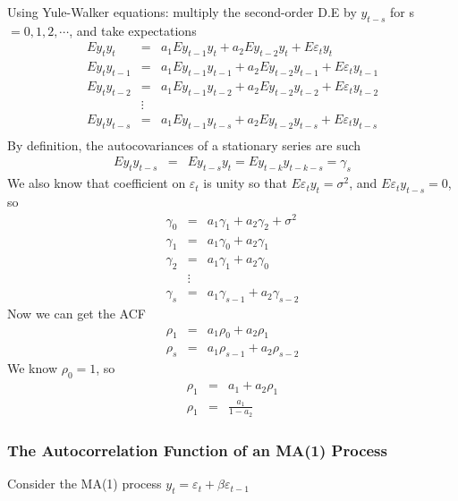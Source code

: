 Using Yule-Walker equations: multiply the second-order D.E by $y_{t-s}$ for s$=0, 1, 2, \cdots$, and take expectations
\begin{eqnarray*}
Ey_{t}y_{t}&=&a_{1}Ey_{t-1}y_{t}+a_{2}Ey_{t-2}y_{t}+E\varepsilon_{t}y_{t}\\
Ey_{t}y_{t-1}&=&a_{1}Ey_{t-1}y_{t-1}+a_{2}Ey_{t-2}y_{t-1}+E\varepsilon_{t}y_{t-1}\\
Ey_{t}y_{t-2}&=&a_{1}Ey_{t-1}y_{t-2}+a_{2}Ey_{t-2}y_{t-2}+E\varepsilon_{t}y_{t-2}\\
&\vdots&\\
Ey_{t}y_{t-s}&=&a_{1}Ey_{t-1}y_{t-s}+a_{2}Ey_{t-2}y_{t-s}+E\varepsilon_{t}y_{t-s}\\
\end{eqnarray*}
By definition, the autocovariances of a stationary series are such 
\begin{eqnarray*}
Ey_{t}y_{t-s}&=&Ey_{t-s}y_{t}=Ey_{t-k}y_{t-k-s}=\gamma_{s}
\end{eqnarray*}
We also know that coefficient on $\varepsilon_{t}$ is unity so that $E\varepsilon_{t}y_{t}=\sigma^{2}$, and $E\varepsilon_{t}y_{t-s}=0$, so
\begin{eqnarray*}
\gamma_{0}&=&a_{1}\gamma_{1}+a_{2}\gamma_{2}+\sigma^{2}\\
\gamma_{1}&=&a_{1}\gamma_{0}+a_{2}\gamma_{1}\\
\gamma_{2}&=&a_{1}\gamma_{1}+a_{2}\gamma_{0}\\
&\vdots&\\
\gamma_{s}&=&a_{1}\gamma_{s-1}+a_{2}\gamma_{s-2}
\end{eqnarray*}
Now we can get the ACF
\begin{eqnarray*}
\rho_{1}&=&a_{1}\rho_{0}+a_{2}\rho_{1}\\
\rho_{s}&=&a_{1}\rho_{s-1}+a_{2}\rho_{s-2}
\end{eqnarray*}
We know $\rho_{0}=1$, so
\begin{eqnarray*}
\rho_{1}&=&a_{1}+a_{2}\rho_{1}\\
\rho_{1}&=&\frac{a_{1}}{1-a_{2}}
\end{eqnarray*}

\subsubsection{The Autocorrelation Function of an MA(1) Process}
Consider the MA(1) process $y_{t}=\varepsilon_{t}+\beta\varepsilon_{t-1}$

